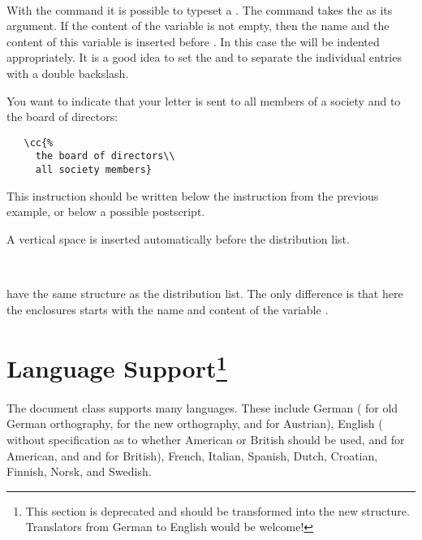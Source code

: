 \begin{Declaration}
  \\
\end{Declaration}
%
%
With the command  it is possible to typeset a
.  The command takes the  as its argument. If the content of the variable
 is not empty, then the name and the content of
this variable is inserted before .  In this
case the  will be indented appropriately.  It
is a good idea to set the 
 and to separate the individual entries with a
double backslash.
\begin{Example}
  You want to indicate that your letter is sent to all members of a
  society and to the board of directors:
\begin{lstlisting}
   \cc{%
     the board of directors\\
     all society members}
\end{lstlisting}
This instruction should be written below the 
instruction from the previous example, or below a possible postscript.
\end{Example}
A vertical space is inserted automatically before the distribution
list.
%
%
%


\begin{Declaration}
  \\
\end{Declaration}
%
%
 have the same structure as the distribution list.
The only difference is that here the enclosures starts with the name
and content of the variable .
%
%
%


\section{Language Support\protect\footnote{This section is
  deprecated and should be transformed into the new structure. Translators
  from German to English would be welcome!}}
\label{sec:scrlttr2.languages}
%

The document class  supports many languages.  These
include German ( for old German orthography,
 for the new orthography, and  for
Austrian), English ( without specification as to
whether American or British should be used,  and
 for American, and  and
 for British), French, Italian, Spanish, Dutch,
Croatian, Finnish, Norsk, and
Swedish.

